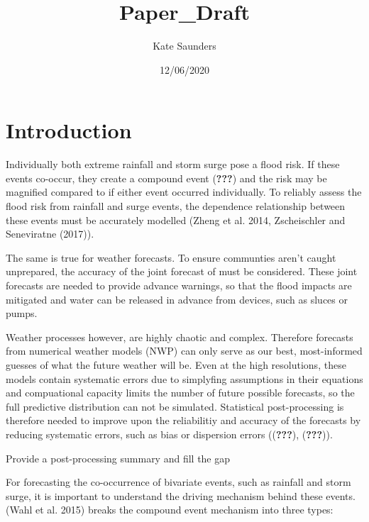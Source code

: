 \documentclass[]{article}
\title{Paper\_Draft}
\author{Kate Saunders}
\date{12/06/2020}
\begin{document}
\maketitle

\section{Introduction}\label{introduction}

Individually both extreme rainfall and storm surge pose a flood risk. If
these events co-occur, they create a compound event ({\textbf{???}}) and
the risk may be magnified compared to if either event occurred
individually. To reliably assess the flood risk from rainfall and surge
events, the dependence relationship between these events must be
accurately modelled (Zheng et al. 2014, Zscheischler and Seneviratne
(2017)).

The same is true for weather forecasts. To ensure communties aren't
caught unprepared, the accuracy of the joint forecast of must be
considered. These joint forecasts are needed to provide advance
warnings, so that the flood impacts are mitigated and water can be
released in advance from devices, such as sluces or pumps.

Weather processes however, are highly chaotic and complex. Therefore
forecasts from numerical weather models (NWP) can only serve as our
best, most-informed guesses of what the future weather will be. Even at
the high resolutions, these models contain systematic errors due to
simplyfing assumptions in their equations and compuational capacity
limits the number of future possible forecasts, so the full predictive
distribution can not be simulated. Statistical post-processing is
therefore needed to improve upon the reliabilitiy and accuracy of the
forecasts by reducing systematic errors, such as bias or dispersion
errors (({\textbf{???}}), ({\textbf{???}})).

Provide a post-processing summary and fill the gap

For forecasting the co-occurrence of bivariate events, such as rainfall
and storm surge, it is important to understand the driving mechanism
behind these events. (Wahl et al. 2015) breaks the compound event
mechanism into three types:
\end{document}
